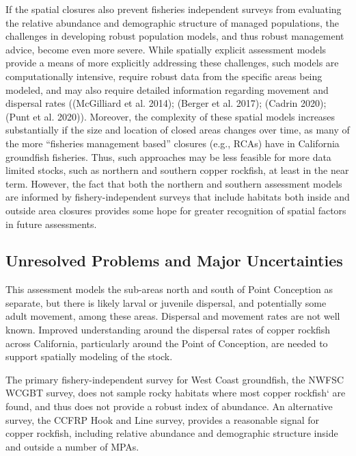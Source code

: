 \documentclass[11pt,
  english,
  letterpaper,
]{article}
\begin{document}
If the spatial closures also prevent fisheries independent surveys from evaluating the relative abundance and demographic structure of managed populations, the challenges in developing robust population models, and thus robust management advice, become even more severe. While spatially explicit assessment models provide a means of more explicitly addressing these challenges, such models are computationally intensive, require robust data from the specific areas being modeled, and may also require detailed information regarding movement and dispersal rates ((McGilliard et al. 2014); (Berger et al. 2017); (Cadrin 2020); (Punt et al. 2020)). Moreover, the complexity of these spatial models increases substantially if the size and location of closed areas changes over time, as many of the more ``fisheries management based'' closures (e.g., RCAs) have in California groundfish fisheries. Thus, such approaches may be less feasible for more data limited stocks, such as northern and southern copper rockfish, at least in the near term. However, the fact that both the northern and southern assessment models are informed by fishery-independent surveys that include habitats both inside and outside area closures provides some hope for greater recognition of spatial factors in future assessments.

\hypertarget{unresolved-problems-and-major-uncertainties-1}{%
\subsection{Unresolved Problems and Major Uncertainties}\label{unresolved-problems-and-major-uncertainties-1}}

This assessment models the sub-areas north and south of Point Conception as separate, but there is likely larval or juvenile dispersal, and potentially some adult movement, among these areas. Dispersal and movement rates are not well known. Improved understanding around the dispersal rates of copper rockfish across California, particularly around the Point of Conception, are needed to support spatially modeling of the stock.

The primary fishery-independent survey for West Coast groundfish, the NWFSC WCGBT survey, does not sample rocky habitats where most copper rockfish` are found, and thus does not provide a robust index of abundance. An alternative survey, the CCFRP Hook and Line survey, provides a reasonable signal for copper rockfish, including relative abundance and demographic structure inside and outside a number of MPAs.
\end{document}
